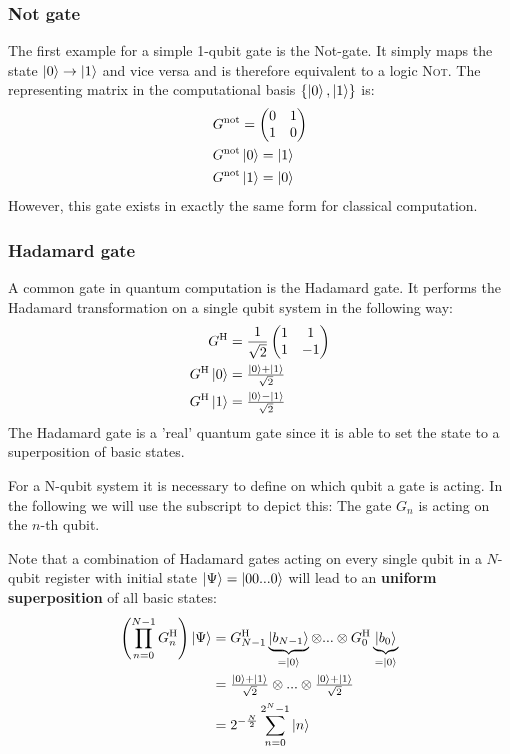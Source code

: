 \documentclass[bibliography=totocnumbered]{article}
\theoremstyle{NoticeStyle}
\begin{document}
\subsubsection{Not gate}
The first example for a simple 1-qubit gate is the Not-gate. It simply maps the state $\ket{0}\rightarrow\ket{1}$ and vice versa and is therefore equivalent to a logic \textsc{Not}. The representing matrix in the computational basis $\{\ket{0}, \ket{1}\}$ is:
%
\begin{align}
	& G^\text{not} =
	\begin{pmatrix}
		0 & 1\\
		1 & 0
	\end{pmatrix}\\
	& G^\text{not} \ket{0} = \ket{1}\\
	& G^\text{not} \ket{1} = \ket{0}
\end{align}
%
However, this gate exists in exactly the same form for classical computation.

\subsubsection{Hadamard gate}
A common gate in quantum computation is the Hadamard gate. It performs the Hadamard transformation on a single qubit system in the following way:
%
\begin{align}
	G^\text{H} & = 
		\frac{1}{\sqrt{2}}
		\begin{pmatrix}
			1 & 1\\
			1 & -1
		\end{pmatrix}\\
	G^\text{H} \ket{0} & = \tfrac{\ket{0} + \ket{1}}{\sqrt{2}}\\
	G^\text{H} \ket{1} & = \tfrac{\ket{0} - \ket{1}}{\sqrt{2}}
\end{align}
%
The Hadamard gate is a 'real' quantum gate since it is able to set the state to a superposition of basic states.

For a N-qubit system it is necessary to define on which qubit a gate is acting. In the following we will use the subscript to depict this: The gate $G_n$ is acting on the $n$-th qubit.

Note that a combination of Hadamard gates acting on every single qubit in a $N$-qubit register with initial state $\ket{\Psi}=\ket{00...0}$ will lead to an \textbf{uniform superposition} of all basic states:
%
\begin{align}
	\left(  \prod_{n=0}^{N-1} G^\text{H}_n  \right) \ket{\Psi}
	&= G^\text{H}_{N-1} \underbrace{\ket{b_{N-1}}}_{=\ket{0}} \otimes ... \otimes G^\text{H}_{0} \underbrace{\ket{b_{0}}}_{=\ket{0}}\\
	&= \tfrac{\ket{0} + \ket{1}}{\sqrt{2}} \otimes ... \otimes \tfrac{\ket{0} + \ket{1}}{\sqrt{2}}\\
	&= 2^{-\frac{N}{2}} \sum_{n=0}^{2^N-1} \ket{n}
\end{align}
%
\end{document}
